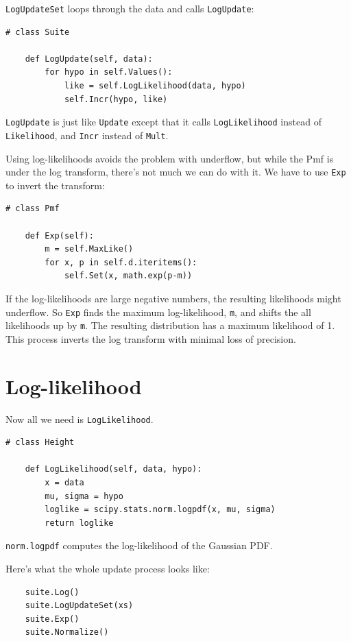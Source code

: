 \documentclass[12pt]{book}
\begin{document}
{\tt LogUpdateSet} loops through the data and calls {\tt LogUpdate}:

\begin{verbatim}
# class Suite

    def LogUpdate(self, data):
        for hypo in self.Values():
            like = self.LogLikelihood(data, hypo)
            self.Incr(hypo, like)
\end{verbatim}

{\tt LogUpdate} is just like {\tt Update} except that it calls
{\tt LogLikelihood} instead of {\tt Likelihood}, and {\tt Incr}
instead of {\tt Mult}.

Using log-likelihoods avoids the problem with underflow, but while
the Pmf is under the log transform, there's not much we can do with
it.  We have to use {\tt Exp} to invert the transform:

\begin{verbatim}
# class Pmf

    def Exp(self):
        m = self.MaxLike()
        for x, p in self.d.iteritems():
            self.Set(x, math.exp(p-m))
\end{verbatim}

If the log-likelihoods are large negative numbers, the resulting
likelihoods might underflow.  So {\tt Exp} finds the maximum
log-likelihood, {\tt m}, and shifts the all likelihoods up by {\tt m}.
The resulting distribution has a maximum likelihood of 1.  This
process inverts the log transform with minimal loss of precision.


\section{Log-likelihood}

Now all we need is {\tt LogLikelihood}.

\begin{verbatim}
# class Height

    def LogLikelihood(self, data, hypo):
        x = data
        mu, sigma = hypo
        loglike = scipy.stats.norm.logpdf(x, mu, sigma)
        return loglike
\end{verbatim}

{\tt norm.logpdf} computes the log-likelihood of the
Gaussian PDF.


Here's what the whole update process looks like:

\begin{verbatim}
    suite.Log()
    suite.LogUpdateSet(xs)
    suite.Exp()
    suite.Normalize()
\end{verbatim}
\end{document}
